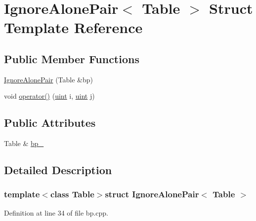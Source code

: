 \hypertarget{struct_ignore_alone_pair}{\section{Ignore\+Alone\+Pair$<$ Table $>$ Struct Template Reference}
\label{struct_ignore_alone_pair}
}
\subsection*{Public Member Functions}
\begin{DoxyCompactItemize}
\item 
\hyperlink{struct_ignore_alone_pair_a88291c9e027856315569fda9770828fc}{Ignore\+Alone\+Pair} (Table \&bp)
\item 
void \hyperlink{struct_ignore_alone_pair_a8e987592f842468ce1c717115ac0cf35}{operator()} (\hyperlink{cyktable_8h_a91ad9478d81a7aaf2593e8d9c3d06a14}{uint} i, \hyperlink{cyktable_8h_a91ad9478d81a7aaf2593e8d9c3d06a14}{uint} j)
\end{DoxyCompactItemize}
\subsection*{Public Attributes}
\begin{DoxyCompactItemize}
\item 
Table \& \hyperlink{struct_ignore_alone_pair_ae533686c3a4848b5431a254d1dd47ee5}{bp\+\_\+}
\end{DoxyCompactItemize}


\subsection{Detailed Description}
\subsubsection*{template$<$class Table$>$struct Ignore\+Alone\+Pair$<$ Table $>$}



Definition at line 34 of file bp.\+cpp.



